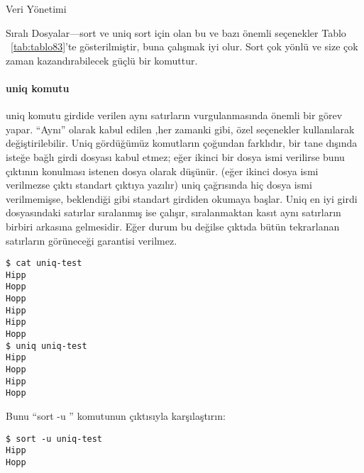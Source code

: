 \begin{section}{Veri Yönetimi}
\begin{subsection}{Sıralı Dosyalar—sort ve uniq}
sort için olan bu ve bazı önemli seçenekler Tablo ~\ref{tab:tablo83}'te gösterilmiştir, buna çalışmak iyi olur. Sort çok yönlü ve size çok zaman kazandırabilecek güçlü bir komuttur.
\paragraph{uniq komutu}{uniq komutu girdide verilen aynı satırların vurgulanmasında önemli bir görev yapar.  “Aynı” olarak kabul edilen ,her zamanki gibi, özel seçenekler kullanılarak değiştirilebilir. Uniq gördüğümüz komutların çoğundan farklıdır, bir tane dışında isteğe bağlı girdi dosyası kabul etmez; eğer ikinci bir dosya ismi verilirse bunu çıktının konulması istenen dosya olarak düşünür. (eğer ikinci dosya ismi verilmezse çıktı standart çıktıya yazılır) uniq çağrısında hiç dosya ismi verilmemişse, beklendiği gibi standart girdiden okumaya başlar. Uniq en iyi girdi dosyasındaki satırlar sıralanmış ise çalışır, sıralanmaktan kasıt aynı satırların birbiri arkasına gelmesidir. Eğer durum bu değilse çıktıda bütün tekrarlanan satırların görüneceği garantisi verilmez.}
\footnotesize
\begin{verbatim}
$ cat uniq-test
Hipp
Hopp
Hopp
Hipp
Hipp
Hopp
$ uniq uniq-test
Hipp
Hopp
Hipp
Hopp
\end{verbatim}
\normalsize

Bunu “sort -u ” komutunun çıktısıyla karşılaştırın:
\footnotesize
\begin{verbatim}
$ sort -u uniq-test
Hipp
Hopp
\end{verbatim}
\normalsize


\end{subsection}
\end{section}
